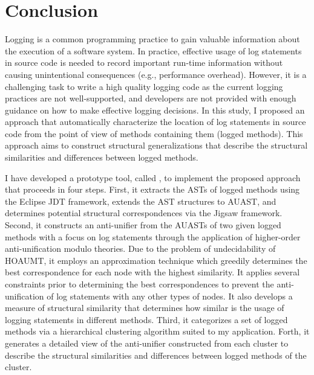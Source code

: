 
\chapter{Conclusion}  \label{conc}

Logging is a common programming practice to gain valuable information about the execution of a software system. In practice, effective usage of log statements in source code is needed to record important run-time information without causing unintentional consequences (e.g., performance overhead). However, it is a challenging task to write a high quality logging code as the current logging practices are not well-supported, and developers are not provided with enough guidance on how to make effective logging decisions. In this study, I proposed an approach that automatically characterize the location of log statements in source code from the point of view of methods containing them (logged methods). This approach aims to construct structural generalizations that describe the structural similarities and differences between logged methods.


I have developed a prototype tool, called , to implement the proposed approach that proceeds in four steps. First, it extracts the ASTs of logged methods using the Eclipse JDT framework, extends the AST structures to AUAST, and determines potential structural correspondences via the Jigsaw framework. Second, it constructs an anti-unifier from the AUASTs of two given logged methods with a focus on log statements through the application of higher-order anti-unification modulo theories. Due to the problem of undecidability of HOAUMT, it employs an approximation technique which greedily determines the best correspondence for each node with the highest similarity. It applies several constraints prior to determining the best correspondences to prevent the anti-unification of log statements with any other types of nodes. It also develops a measure of structural similarity that determines how similar is the usage of logging statements in different methods. Third, it categorizes a set of logged methods via a hierarchical clustering algorithm suited to my application. Forth, it generates a detailed view of the anti-unifier constructed from each cluster to describe the structural similarities and differences between logged methods of the cluster. 

